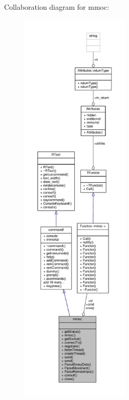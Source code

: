 Collaboration diagram for mmoc\+:
\nopagebreak
\begin{figure}[H]
\begin{center}
\leavevmode
\includegraphics[height=550pt]{df/dd9/classmmoc__coll__graph}
\end{center}
\end{figure}
